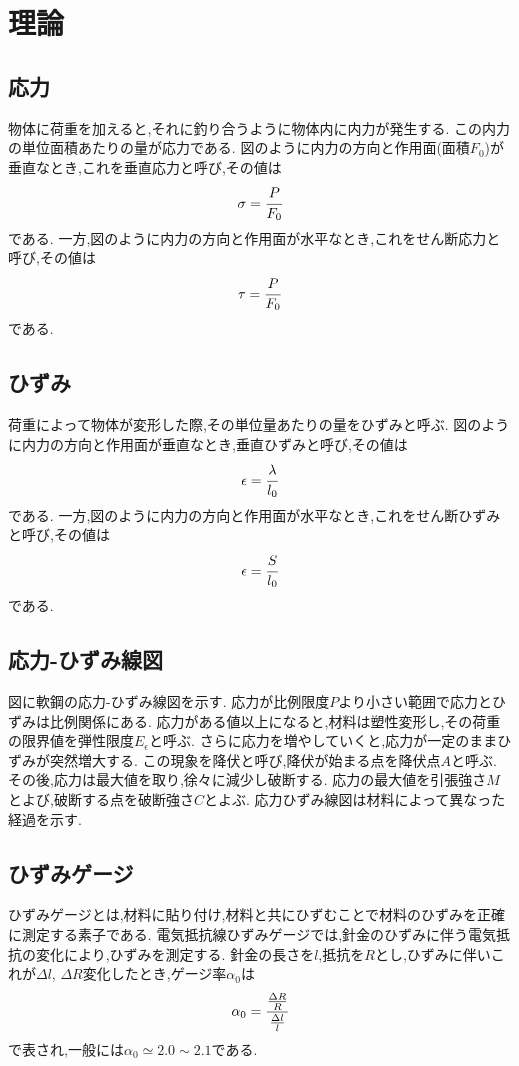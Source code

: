 \section{理論}
\subsection{応力}
物体に荷重を加えると,それに釣り合うように物体内に内力が発生する.
この内力の単位面積あたりの量が応力である.
図のように内力の方向と作用面(面積$F_0$)が垂直なとき,これを垂直応力と呼び,その値は
\begin{align}
  \sigma=\cfrac{P}{F_0}
\end{align}
である.
一方,図のように内力の方向と作用面が水平なとき,これをせん断応力と呼び,その値は
\begin{align}
  \tau=\cfrac{P}{F_0}  
\end{align}
である.
\subsection{ひずみ}
荷重によって物体が変形した際,その単位量あたりの量をひずみと呼ぶ.
図のように内力の方向と作用面が垂直なとき,垂直ひずみと呼び,その値は
\begin{align}
  \epsilon=\cfrac{\lambda}{l_0}  
\end{align}
である.
一方,図のように内力の方向と作用面が水平なとき,これをせん断ひずみと呼び,その値は
\begin{align}
  \epsilon=\cfrac{S}{l_0}  
\end{align}
である.
\subsection{応力-ひずみ線図}
図に軟鋼の応力-ひずみ線図を示す.
応力が比例限度$P$より小さい範囲で応力とひずみは比例関係にある.
応力がある値以上になると,材料は塑性変形し,その荷重の限界値を弾性限度$E_{\epsilon}$と呼ぶ.
さらに応力を増やしていくと,応力が一定のままひずみが突然増大する.
この現象を降伏と呼び,降伏が始まる点を降伏点$A$と呼ぶ.
その後,応力は最大値を取り,徐々に減少し破断する.
応力の最大値を引張強さ$M$とよび,破断する点を破断強さ$C$とよぶ.
応力ひずみ線図は材料によって異なった経過を示す.
\subsection{ひずみゲージ}
ひずみゲージとは,材料に貼り付け,材料と共にひずむことで材料のひずみを正確に測定する素子である.
電気抵抗線ひずみゲージでは,針金のひずみに伴う電気抵抗の変化により,ひずみを測定する.
針金の長さを$l$,抵抗を$R$とし,ひずみに伴いこれが$\Delta l$, $\Delta R$変化したとき,ゲージ率$\alpha_0$は
\begin{align}
  \alpha_0=\cfrac{\frac{\Delta R}{R}}{\frac{\Delta l}{l}}
\end{align}
で表され,一般には$\alpha_0\simeq 2.0\sim 2.1$である.